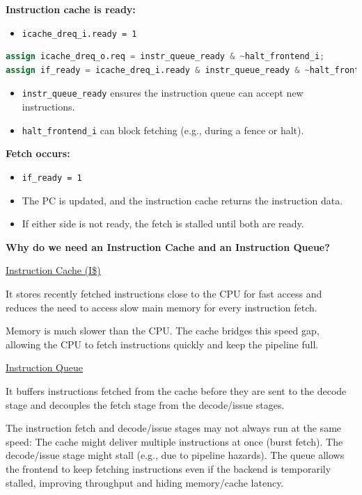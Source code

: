 \documentclass[12pt, a4paper]{article}
\begin{document}
\textbf{Instruction cache is ready:}
\begin{itemize}[nosep]
    \item \texttt{icache\_dreq\_i.ready = 1}
\end{itemize}

\begin{lstlisting}[language=Verilog, frame=single, basicstyle=\ttfamily\footnotesize, numbers = none]
assign icache_dreq_o.req = instr_queue_ready & ~halt_frontend_i;
assign if_ready = icache_dreq_i.ready & instr_queue_ready & ~halt_frontend_i;
\end{lstlisting}

\begin{itemize}[nosep]
    \item \texttt{instr\_queue\_ready} ensures the instruction queue can accept new instructions.
    \item \texttt{halt\_frontend\_i} can block fetching (e.g., during a fence or halt).
\end{itemize}

\textbf{Fetch occurs:}
\begin{itemize}[nosep]
    \item \texttt{if\_ready = 1}
    \item The PC is updated, and the instruction cache returns the instruction data.
    \item If either side is not ready, the fetch is stalled until both are ready.
\end{itemize}

\vspace{0.5em}

\textbf{Why do we need an Instruction Cache and an Instruction Queue?}

\ul{Instruction Cache (I\$)}

It stores recently fetched instructions close to the CPU for fast access and reduces the need to access slow main memory for every instruction fetch.

Memory is much slower than the CPU. The cache bridges this speed gap, allowing the CPU to fetch instructions quickly and keep the pipeline full.

\ul{Instruction Queue}  

It buffers instructions fetched from the cache before they are sent to the decode stage and decouples the fetch stage from the decode/issue stages.

The instruction fetch and decode/issue stages may not always run at the same speed:
The cache might deliver multiple instructions at once (burst fetch).
The decode/issue stage might stall (e.g., due to pipeline hazards).
The queue allows the frontend to keep fetching instructions even if the backend is temporarily stalled, improving throughput and hiding memory/cache latency.
\end{document}
